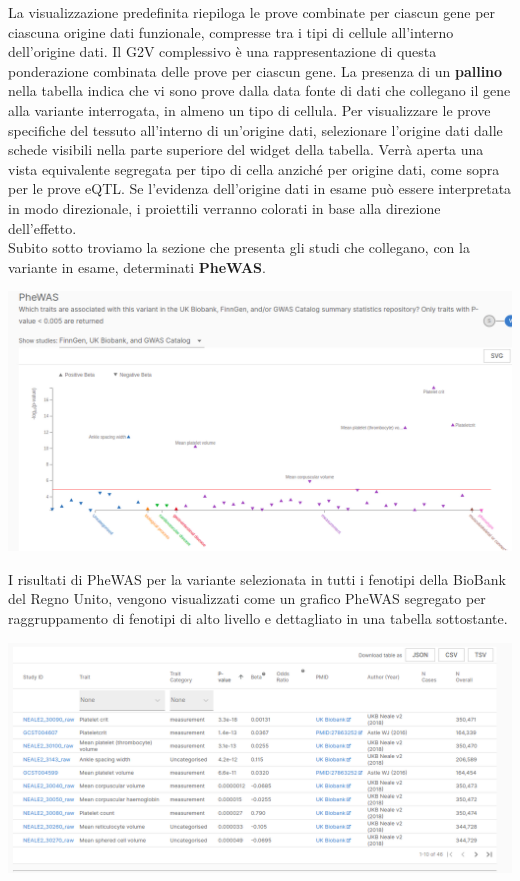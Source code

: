 \documentclass{article}
\begin{document}
La visualizzazione predefinita riepiloga le prove combinate per ciascun gene per ciascuna origine dati funzionale, compresse tra i tipi di cellule all'interno dell'origine dati. Il G2V complessivo è una rappresentazione di questa ponderazione combinata delle prove per ciascun gene. 
La presenza di un \textbf{pallino} nella tabella indica che vi sono prove dalla data fonte di dati che collegano il gene alla variante interrogata, in almeno un tipo di cellula.
Per visualizzare le prove specifiche del tessuto all'interno di un'origine dati, selezionare l'origine dati dalle schede visibili nella parte superiore del widget della tabella. Verrà aperta una vista equivalente segregata per tipo di cella anziché per origine dati, come sopra per le prove eQTL. Se l'evidenza dell'origine dati in esame può essere interpretata in modo direzionale, i proiettili verranno colorati in base alla direzione dell'effetto.\\
Subito sotto troviamo la sezione che presenta gli studi che collegano, con la variante in esame, determinati \textbf{PheWAS}. 
\begin{center}
    \includegraphics[width=1\textwidth]{figures/11-Variante.png}
\end{center}
I risultati di PheWAS per la variante selezionata in tutti i fenotipi della BioBank del Regno Unito, vengono visualizzati come un grafico PheWAS segregato per raggruppamento di fenotipi di alto livello e dettagliato in una tabella sottostante.\\
\begin{center}
    \includegraphics[width=1\textwidth]{figures/13-Variante.png}
\end{center}
\end{document}
